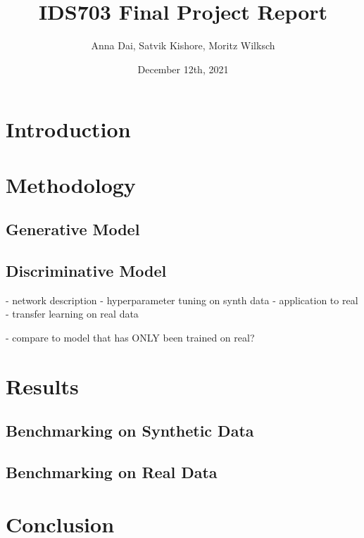 \documentclass[11pt]{article}
\title{IDS703 Final Project Report}
\author{Anna Dai, Satvik Kishore, Moritz Wilksch}
\date{December 12th, 2021}
\begin{document}
\maketitle

\section{Introduction}

\section{Methodology}

\subsection{Generative Model}



\subsection{Discriminative Model}
- network description
- hyperparameter tuning on synth data
- application to real
- transfer learning on real data

- compare to model that has ONLY been trained on real?

\section{Results}
\subsection{Benchmarking on Synthetic Data}

\begin{center}
	
\end{center}


\subsection{Benchmarking on Real Data}

\section{Conclusion}
\end{document}
